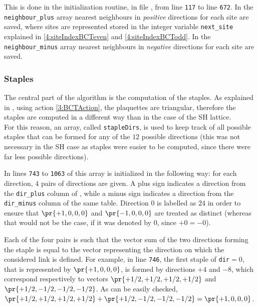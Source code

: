 This is done in the initialization routine, in file , from line \texttt{117} to line \texttt{672}.
In the \texttt{neighbour\_plus} array nearest neighbours in \emph{positive} directions for each site are saved, where sites are represented stored in the integer variable \texttt{next\_site} explained in \eqref{4:siteIndexBCTeven} and \eqref{4:siteIndexBCTodd}.
In the \texttt{neighbour\_minus} array nearest neighbours in \emph{negative} directions for each site are saved.

\subsubsection{Staples}
The central part of the algorithm is the computation of the staples.
As explained in , using action \eqref{3:BCTAction}, the plaquettes are triangular, therefore the staples are computed in a different way than in the case of the SH lattice.\\
For this reason, an array, called \texttt{stapleDirs}, is used to keep track of all possible staples that can be formed for any of the $12$ possible directions (this was not necessary in the SH case as staples were easier to be computed, since there were far less possible directions).

In lines \texttt{743} to \texttt{1063} of  this array is initialized in the following way: for each direction, $4$ pairs of directions are given.
A plus sign indicates a direction from the \texttt{dir\_plus} column of , while a minus sign indicates a direction from the \texttt{dir\_minus} column of the same table.
Direction $0$ is labelled as $24$ in order to ensure that $\pr{+1,0,0,0}$ and $\pr{-1,0,0,0}$ are treated as distinct (whereas that would not be the case, if it was denoted by $0$, since $+0=-0$).

Each of the four pairs is such that the vector sum of the two directions forming the staple is equal to the vector representing the direction on which the considered link is defined.
For example, in line \texttt{746}, the first staple of \texttt{dir}$=0$, that is represented by $\pr{+1,0,0,0}$, is formed by directions $+4$ and $-8$, which correspond respectively to vectors $\pr{+1/2,+1/2,+1/2,+1/2}$ and $\pr{+1/2,-1/2,-1/2,-1/2}$.
As can be easily checked, $\pr{+1/2,+1/2,+1/2,+1/2}+\pr{+1/2,-1/2,-1/2,-1/2}=\pr{+1,0,0,0}$.

